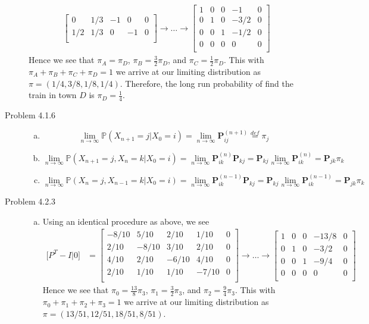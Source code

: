 \documentclass[12pt]{article}  %
\newcommand{\prob}{{\mathbb{P}}}
\begin{document}
\begin{description}
\begin{align*}
\begin{bmatrix}
0 & 1/3 & -1 & 0 &0\\
1/2 & 1/3 & 0 & -1 &0\\
\end{bmatrix}
\rightarrow\dots\rightarrow
\begin{bmatrix}
1 & 0 & 0 & -1 & 0 \\
0 & 1 & 0 & -3/2 &0\\
0 & 0 & 1 & -1/2 &0\\
0 & 0 & 0 & 0 &0\\
\end{bmatrix}
\end{align*}
Hence we see that $\pi_A = \pi_D$, $\pi_B = \frac{3}{2}\pi_D$, and $\pi_C = \frac{1}{2}\pi_D$. This with $\pi_A + \pi_B + \pi_C + \pi_D =1$ we arrive at our limiting distribution as $\pi = (1/4, 3/8, 1/8, 1/4)$. Therefore, the long run probability of find the train in town $D$ is $\pi_D = \frac{1}{4}$.  
\item[Problem 4.1.6]
\begin{enumerate}[(a)]
\item $$\lim_{n\to\infty}\prob(X_{n+1} = j|X_0 = i) = \lim_{n\to\infty}\mathbf{P}^{(n+1)}_{ij}\overset{def}{=}\pi_{j}$$
\item $$\lim_{n\to\infty}\prob(X_{n+1} = j, X_{n} = k|X_0 = i) = \lim_{n\to\infty}\mathbf{P}^{(n)}_{ik}\mathbf{P}_{kj} = \mathbf{P}_{kj}\lim_{n\to\infty}\mathbf{P}^{(n)}_{ik}= \mathbf{P}_{jk}\pi_k$$
\item $$\lim_{n\to\infty}\prob(X_{n} = j, X_{n-1} = k|X_0 = i) = \lim_{n\to\infty}\mathbf{P}^{(n-1)}_{ik}\mathbf{P}_{kj} = \mathbf{P}_{kj}\lim_{n\to\infty}\mathbf{P}^{(n-1)}_{ik}= \mathbf{P}_{jk}\pi_k$$
\end{enumerate}
\item[Problem 4.2.3]
\begin{enumerate}[(a)]
\item Using an identical procedure as above, we see 
\begin{align*}
\Big[P^T - I\Big\vert 0\Big] &= 
\begin{bmatrix}
-8/10 & 5/10 & 2/10 & 1/10 & 0\\
2/10 & -8/10 & 3/10 & 2/10 & 0\\
4/10 & 2/10 & -6/10 & 4/10 & 0\\
2/10 & 1/10 & 1/10 & -7/10 & 0\\
\end{bmatrix}
\rightarrow\dots\rightarrow
\begin{bmatrix}
1 & 0 & 0 & -13/8 & 0\\
0 & 1 & 0 & -3/2 & 0\\
0 & 0 & 1 & -9/4 & 0\\
0 & 0 & 0 & 0 & 0\\
\end{bmatrix}
\end{align*}
Hence we see that $\pi_0 = \frac{13}{8}\pi_3$, $\pi_1 = \frac{3}{2}\pi_3$, and $\pi_2 = \frac{9}{4}\pi_3$. This with $\pi_0 + \pi_1 + \pi_2 + \pi_3 =1$ we arrive at our limiting distribution as $\pi = (13/51, 12/51, 18/51, 8/51)$.


\end{enumerate}
\end{description}
\end{document}
